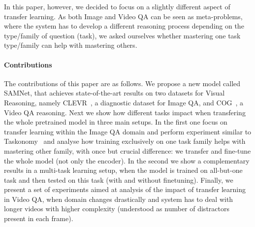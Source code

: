 In this paper, however, we decided to focus on a slightly different  aspect of transfer learning.
As both Image and Video QA can be seen as meta-problems, where the system has to develop a different reasoning process depending on the type/family of question (task), we asked ourselves whether mastering one task type/family can help with mastering others.

\paragraph{Contributions}

The contributions of this paper are as follows.
We propose a new model called SAMNet, that achieves state-of-the-art results on two datasets for Visual Reasoning, namely CLEVR~\cite{johnson2017clevr}, a diagnostic dataset for Image QA, and COG~\cite{yang2018dataset}, a Video QA reasoning.
Next we show how different tasks impact when transfering the whole pretrained model in three main setups.
In the first one focus on transfer learning within the Image QA domain and perform experiment similar to Taskonomy~\cite{zamir2018taskonomy} and analyse how training exclusively on one task family helps with mastering other family, with once but crucial difference: we transfer and fine-tune the whole model (not only the encoder).
In the second we show a complementary results in a multi-task learning setup, when the model is trained on all-but-one task and then tested on this task (with and without finetuning).
Finally, we present a set of experiments aimed at analysis of the impact of transfer learning in Video QA, when domain changes drastically and system has to deal with longer videos with higher complexity (understood as number of distractors present in each frame).


 



